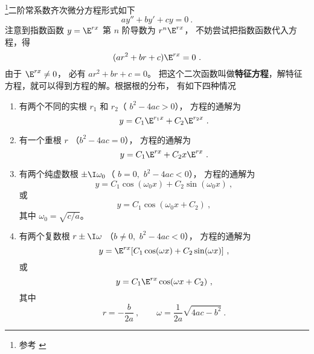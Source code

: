 

\begin{issues}
\end{issues}

\footnote{参考 \cite{同济高}}二阶常系数齐次微分方程形式如下
\begin{equation}
ay'' + by' + cy = 0~.
\end{equation}
注意到指数函数 $y = \E^{rx}$ 第 $n$ 阶导数为 $r^n \E^{rx}$， 不妨尝试把指数函数代入方程，得
\begin{equation}
(a r^2 + br + c) \E^{rx} = 0~.
\end{equation}
由于 $\E^{rx} \ne 0$， 必有 $a r^2 + br + c = 0$。 把这个二次函数叫做\textbf{特征方程}，解特征方程，就可以得到方程的解。根据根的分布， 有如下四种情况

\begin{enumerate}
\item 有两个不同的实根 $r_1$ 和  $r_2$（ $b^2 - 4ac > 0$）， 方程的通解为
\begin{equation}
y = C_1 \E^{r_1 x} + C_2 \E^{r_2 x}~.
\end{equation}
\item 有一个重根 $r$ （$b^2 - 4ac = 0$）， 方程的通解为
\begin{equation}\label{eq_Ode2_4}
y = C_1 \E^{rx} + C_2 x \E^{rx}~.
\end{equation}
\item 有两个纯虚数根 $\pm \I \omega_0$（ $b = 0,\,\, b^2 - 4ac < 0$）， 方程的通解为
\begin{equation}
y = C_1\cos(\omega_0 x) + C_2 \sin(\omega_0 x)~,
\end{equation}
或 
\begin{equation}
y = C_1\cos(\omega_0 x + C_2)~,
\end{equation} 
其中 $\omega_0 = \sqrt{c/a}$。 

\item 有两个复数根 $r \pm \I\omega$ （$b \ne 0,\,\, b^2 - 4ac < 0$）， 方程的通解为
\begin{equation}\label{eq_Ode2_7}
y = \E^{rx} [ C_1\cos(\omega x) + C_2\sin(\omega x) ]~,
\end{equation} 
或 
\begin{equation}
y = C_1\E^{rx}\cos(\omega x + C_2)~,
\end{equation} 
其中
\begin{equation}
r =  - \frac{b}{2a} ~,\qquad \omega  = \frac{1}{2a}\sqrt{4ac - b^2} ~.
\end{equation}

\end{enumerate}

